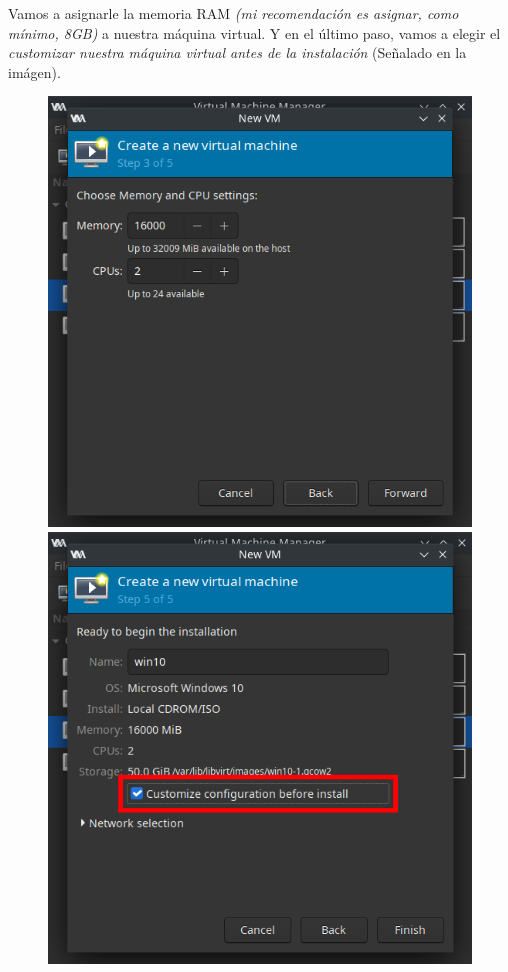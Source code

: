 \documentclass[11pt]{article}
\begin{document}
Vamos a asignarle la memoria RAM \textit{(mi recomendación es asignar, como mínimo, 8GB)} a nuestra máquina virtual. Y en el último paso, vamos a elegir el \textit{customizar nuestra máquina virtual antes de la instalación} (Señalado en la imágen).

\begin{figure}[h]
	\centering
	\begin{minipage}[b]{0.4\textwidth}
		\includegraphics[width=\textwidth]{images/vm-memory-setup.png}
	\end{minipage}
	\begin{minipage}[b]{0.4\textwidth}
		\includegraphics[width=\textwidth]{images/vm-name.png}
	\end{minipage}
\end{figure}
\end{document}
